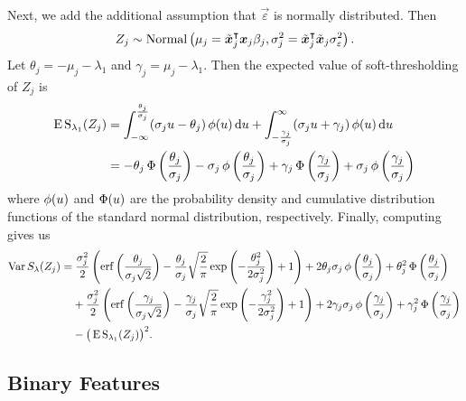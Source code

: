 Next, we add the additional assumption that \(\vec{\varepsilon}\) is normally distributed.
Then
\[
  {Z_j} \sim \operatorname{Normal}\left(\mu_j = \tilde{\boldsymbol{x}}_j^\intercal\boldsymbol{x}_j \beta_j, \sigma_j^2 = \tilde{\boldsymbol{x}}_j^\intercal\tilde{\boldsymbol{x}}_j \sigma_\varepsilon^2 \right).
\]
Let \(\theta_j = -\mu_j -\lambda_1 \) and \(\gamma_j = \mu_j - \lambda_1\). Then the
expected value of soft-thresholding of \({Z_j}\) is
\begin{align}
  \operatorname{E} \operatorname{S}_{\lambda_1}({Z_j}) & = \int_{-\infty}^\frac{\theta_j}{\sigma_j} (\sigma_j u - \theta_j) \operatorname{\phi}(u) \mathop{}\!\mathrm{d} u + \int_{-\frac{\gamma_j}{\sigma_j}}^\infty (\sigma_j u + \gamma_j) \operatorname{\phi}(u) \mathop{}\!\mathrm{d} u                                               \nonumber                              \\
                            & = -\theta_j \operatorname{\Phi}\left(\frac{\theta_j}{\sigma_j}\right) - \sigma_j \operatorname{\phi}\left(\frac{\theta_j}{\sigma_j}\right) + \gamma_j \operatorname{\Phi}\left(\frac{\gamma_j}{\sigma_j}\right) + \sigma_j \operatorname{\phi}\left(\frac{\gamma_j}{\sigma_j}\right) \label{eq:mean-centered-eval}
\end{align}
where \(\operatorname{\phi}(u)\) and \(\operatorname{\Phi}(u)\) are the probability density and cumulative distribution
functions of the standard normal distribution, respectively. Finally, computing  gives us
\begin{align}
  \label{eq:mean-centered-variance}
  \var{S_\lambda(Z_j)} & = \frac{\sigma_j^2}{2} \left( \erf\left(\frac{\theta_j}{\sigma_j\sqrt{2}}\right) - \frac{\theta_j}{\sigma_j}\sqrt{\frac{2}{\pi}} \exp\left(-\frac{\theta_j^2}{2\sigma_j^2}\right) + 1 \right) + 2 \theta_j \sigma_j \pdf \left(\frac{\theta_j}{\sigma_j}\right) + \theta_j^2 \cdf\left(\frac{\theta_j}{\sigma_j}\right) \nonumber               \\
                       & \phantom{={}} + \frac{\sigma_j^2}{2} \left( \erf\left(\frac{\gamma_j}{\sigma_j\sqrt{2}}\right) - \frac{\gamma_j}{\sigma_j}\sqrt{\frac{2}{\pi}} \exp\left(-\frac{\gamma_j^2}{2\sigma_j^2}\right) + 1 \right) + 2 \gamma_j \sigma_j \pdf \left(\frac{\gamma_j}{\sigma_j}\right) + \gamma_j^2 \cdf\left(\frac{\gamma_j}{\sigma_j}\right) \nonumber \\
                       & \phantom{={}} - \big(\E \st_{\lambda_1}({Z_j})\big)^2.
\end{align}

\subsection{Binary Features}\label{sec:theory-binary-features}

